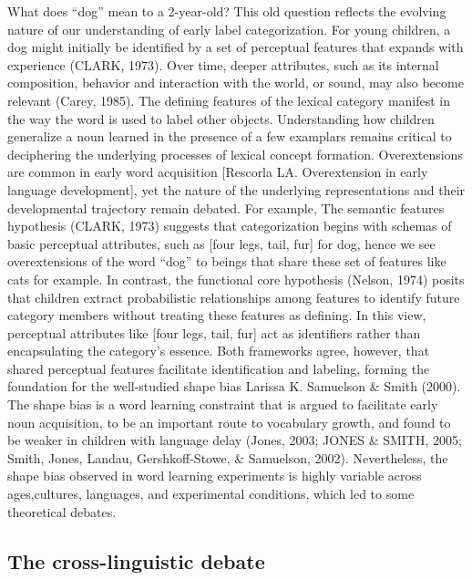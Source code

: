 \documentclass[10pt, letterpaper]{article}
\begin{document}
What does ``dog'' mean to a 2-year-old? This old question reflects the
evolving nature of our understanding of early label categorization. For
young children, a dog might initially be identified by a set of
perceptual features that expands with experience (CLARK, 1973). Over
time, deeper attributes, such as its internal composition, behavior and
interaction with the world, or sound, may also become relevant (Carey,
1985). The defining features of the lexical category manifest in the way
the word is used to label other objects. Understanding how children
generalize a noun learned in the presence of a few examplars remains
critical to deciphering the underlying processes of lexical concept
formation. Overextensions are common in early word acquisition
{[}Rescorla LA. Overextension in early language development{]}, yet the
nature of the underlying representations and their developmental
trajectory remain debated. For example, The semantic features hypothesis
(CLARK, 1973) suggests that categorization begins with schemas of basic
perceptual attributes, such as {[}four legs, tail, fur{]} for dog, hence
we see overextensions of the word ``dog'' to beings that share these set
of features like cats for example. In contrast, the functional core
hypothesis (Nelson, 1974) posits that children extract probabilistic
relationships among features to identify future category members without
treating these features as defining. In this view, perceptual attributes
like {[}four legs, tail, fur{]} act as identifiers rather than
encapsulating the category's essence. Both frameworks agree, however,
that shared perceptual features facilitate identification and labeling,
forming the foundation for the well-studied shape bias Larissa K.
Samuelson \& Smith (2000). The shape bias is a word learning constraint
that is argued to facilitate early noun acquisition, to be an important
route to vocabulary growth, and found to be weaker in children with
language delay (Jones, 2003; JONES \& SMITH, 2005; Smith, Jones, Landau,
Gershkoff-Stowe, \& Samuelson, 2002). Nevertheless, the shape bias
observed in word learning experiments is highly variable across
ages,cultures, languages, and experimental conditions, which led to some
theoretical debates.

\hypertarget{the-cross-linguistic-debate}{%
\subsection{The cross-linguistic
debate}\label{the-cross-linguistic-debate}}
\end{document}
